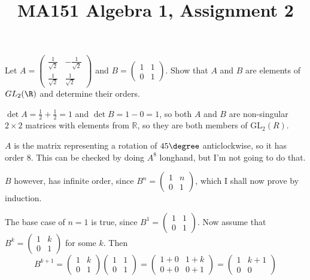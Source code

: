\documentclass[a4paper]{article}
\title{MA151 Algebra 1, Assignment 2}
\begin{document}
\maketitle

\setlength{\parindent}{0em}
\setlength{\parskip}{1em}


\begin{questionbody}
Let $A = \begin{pmatrix} \frac1{\sqrt2} & -\frac1{\sqrt2}\\ \frac1{\sqrt2} & \frac1{\sqrt2} \end{pmatrix}$ and $B = \begin{pmatrix} 1 & 1\\ 0 & 1 \end{pmatrix}$.
Show that $A$ and $B$ are elements of $GL_2(\R)$ and determine their orders.
\end{questionbody}

$\det A = \frac12 + \frac12 = 1$ and $\det B = 1 - 0 = 1$, so both $A$ and $B$ are non-singular $2 \times 2$ matrices with elements from $\mathbb R$, so they are both members of $\text{GL}_2(R)$.

$A$ is the matrix representing a rotation of $45\degree$ anticlockwise, so it has order 8. This can be checked by doing $A^8$ longhand, but I'm not going to do that.

$B$ however, has infinite order, since $B^n = \begin{pmatrix} 1 & n\\ 0 & 1 \end{pmatrix}$, which I shall now prove by induction.

The base case of $n=1$ is true, since $B^1 = \begin{pmatrix} 1 & 1\\ 0 & 1 \end{pmatrix}$. Now assume that $B^k = \begin{pmatrix} 1 & k\\ 0 & 1 \end{pmatrix}$ for some $k$. Then $$B^{k+1} = \begin{pmatrix} 1 & k\\ 0 & 1 \end{pmatrix} \begin{pmatrix} 1 & 1\\ 0 & 1 \end{pmatrix} = \begin{pmatrix} 1+0 & 1+k\\ 0+0 & 0+1 \end{pmatrix} = \begin{pmatrix} 1 & k+1\\ 0 & 0 \end{pmatrix}$$
\end{document}
